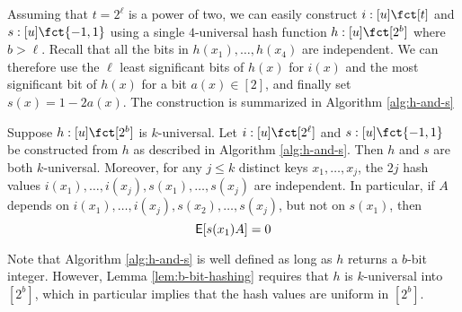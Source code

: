 Assuming that $t=2^\ell$ is a power of two, we can easily construct
$i:[u]\fct[t]$ and $s:[u]\fct\{-1,1\}$ using a single $4$-universal
hash function $h:[u]\fct[2^b]$ where $b>\ell$. Recall that all the bits in
$h(x_1),\ldots,h(x_4)$ are independent. We can therefore use the
$\ell$ least significant bits of $h(x)$ for $i(x)$ and the most
significant bit of $h(x)$ for a bit $a(x)\in[2]$, and finally set
$s(x)=1-2a(x)$. The construction is summarized in Algorithm \ref{alg:h-and-s}
\begin{lemma}\label{lem:b-bit-hashing} Suppose $h:[u]\fct[2^b]$ is $k$-universal. Let
  $i:[u]\fct[2^\ell]$ and
  $s:[u]\fct\{-1,1\}$ be constructed from $h$ as described in Algorithm \ref{alg:h-and-s}. Then $h$ and $s$ are both $k$-universal. Moreover, for
  any $j\leq k$ distinct keys $x_1,\ldots,x_j$, the $2j$ hash
  values $i(x_1),\ldots,i(x_j),s(x_1),\ldots,s(x_j)$ are independent.
  In particular, if $A$ depends on
  $i(x_1),\ldots,i(x_j),s(x_2),\ldots,s(x_j)$, but not on $s(x_1)$, then
\begin{equation}\label{eq:E-0}
  \operatorname*{\sf{E}}[s(x_1)A]=0
\end{equation}
\end{lemma}
Note that Algorithm \ref{alg:h-and-s} is well defined as long as 
$h$ returns a $b$-bit integer. However, Lemma \ref{lem:b-bit-hashing} requires
that $h$ is $k$-universal into $[2^b]$, which in particular implies that
the hash values are uniform in $[2^b]$.


